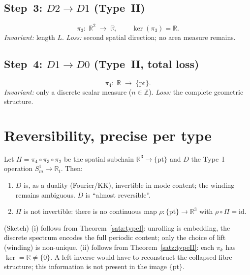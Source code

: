 \subsection{Step~3: $D2 \to D1$ (Type~II)}
\[
  \pi_3:\; \mathbb{R}^2 \;\longrightarrow\; \mathbb{R},
  \qquad \ker(\pi_3) = \mathbb{R}.
\]
\textit{Invariant:} length $L$.\quad
\textit{Loss:} second spatial direction; no area measure remains.

\subsection{Step~4: $D1 \to D0$ (Type~II, total loss)}
\[
  \pi_4:\; \mathbb{R} \;\longrightarrow\; \{\mathrm{pt}\}.
\]
\textit{Invariant:} only a discrete scalar measure ($n\in\mathbb{Z}$).\quad
\textit{Loss:} the complete geometric structure.

\section{Reversibility, precise per type}

\begin{theorem}\label{satz:rev}
Let $\Pi = \pi_4\circ\pi_3\circ\pi_2$ be the spatial subchain
$\mathbb{R}^3 \to \{\mathrm{pt}\}$ and $D$ the Type~I operation
$S^1_m \to \mathbb{R}_t$. Then:
\begin{enumerate}
  \item[(i)] $D$ is, as a duality (Fourier/KK), invertible in mode content; the
  winding remains ambiguous. $D$ is ``almost reversible''.
  \item[(ii)] $\Pi$ is not invertible: there is no continuous map
  $\rho:\{\mathrm{pt}\}\to\mathbb{R}^3$ with $\rho\circ\Pi=\mathrm{id}$.
\end{enumerate}
\end{theorem}

\begin{beweis}
(Sketch) (i) follows from Theorem~\ref{satz:typeI}: unrolling is embedding, the
discrete spectrum encodes the full periodic content; only the choice of lift
(winding) is non-unique. (ii) follows from Theorem~\ref{satz:typeII}: each
$\pi_k$ has $\ker = \mathbb{R}\neq\{0\}$. A left inverse would have to
reconstruct the collapsed fibre structure; this information is not present in
the image $\{\mathrm{pt}\}$.
\end{beweis}

